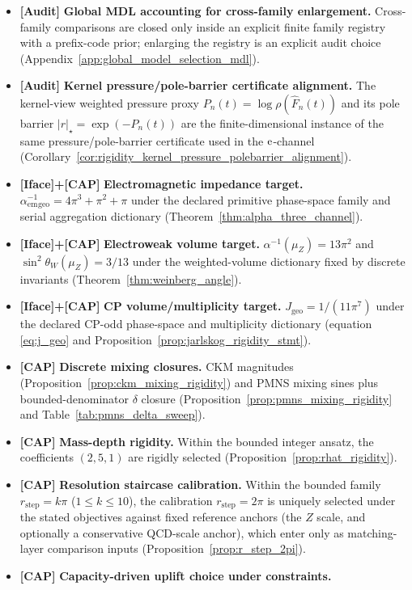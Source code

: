 \begin{itemize}
\item \textbf{[Audit]} \textbf{Global MDL accounting for cross-family enlargement.}
Cross-family comparisons are closed only inside an explicit finite family registry with a prefix-code prior; enlarging the registry is an explicit audit choice (Appendix~\ref{app:global_model_selection_mdl}).
\item \textbf{[Audit]} \textbf{Kernel pressure/pole-barrier certificate alignment.}
The kernel-view weighted pressure proxy $P_n(t)=\log\rho(\widehat F_n(t))$ and its pole barrier $|r|_\star=\exp(-P_n(t))$ are the finite-dimensional instance of the same pressure/pole-barrier certificate used in the $\mathrm{e}$-channel (Corollary~\ref{cor:rigidity_kernel_pressure_polebarrier_alignment}).
\item \textbf{[Iface]+[CAP]} \textbf{Electromagnetic impedance target.}
$\alpha_{\mathrm{em}}^{-1}{}_{\mathrm{geo}}=4\pi^3+\pi^2+\pi$ under the declared primitive phase-space family and serial aggregation dictionary (Theorem~\ref{thm:alpha_three_channel}).
\item \textbf{[Iface]+[CAP]} \textbf{Electroweak volume target.}
$\alpha^{-1}(\mu_Z)=13\pi^2$ and $\sin^2\theta_W(\mu_Z)=3/13$ under the weighted-volume dictionary fixed by discrete invariants (Theorem~\ref{thm:weinberg_angle}).
\item \textbf{[Iface]+[CAP]} \textbf{CP volume/multiplicity target.}
$J_{\mathrm{geo}}=1/(11\pi^7)$ under the declared CP-odd phase-space and multiplicity dictionary (equation \eqref{eq:j_geo} and Proposition~\ref{prop:jarlskog_rigidity_stmt}).
\item \textbf{[CAP]} \textbf{Discrete mixing closures.}
CKM magnitudes (Proposition~\ref{prop:ckm_mixing_rigidity}) and PMNS mixing sines plus bounded-denominator $\delta$ closure (Proposition~\ref{prop:pmns_mixing_rigidity} and Table~\ref{tab:pmns_delta_sweep}).
\item \textbf{[CAP]} \textbf{Mass-depth rigidity.}
Within the bounded integer ansatz, the coefficients $(2,5,1)$ are rigidly selected (Proposition~\ref{prop:rhat_rigidity}).
\item \textbf{[CAP]} \textbf{Resolution staircase calibration.}
Within the bounded family $r_{\mathrm{step}}=k\pi$ ($1\le k\le 10$), the calibration $r_{\mathrm{step}}=2\pi$ is uniquely selected under the stated objectives against fixed reference anchors (the $Z$ scale, and optionally a conservative QCD-scale anchor), which enter only as matching-layer comparison inputs (Proposition~\ref{prop:r_step_2pi}).
\item \textbf{[CAP]} \textbf{Capacity-driven uplift choice under constraints.}

\end{itemize}
